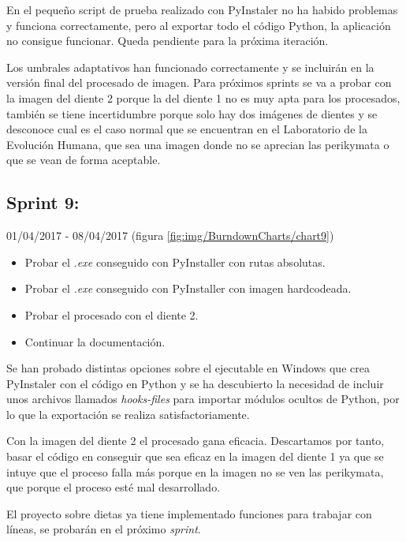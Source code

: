 En el pequeño script de prueba realizado con PyInstaler no ha habido problemas y funciona correctamente, pero al exportar todo el código Python, la aplicación no consigue funcionar. Queda pendiente para la próxima iteración.

Los umbrales adaptativos han funcionado correctamente y se incluirán en la versión final del procesado de imagen. Para próximos sprints se va a probar con la imagen del diente 2 porque la del diente 1 no es muy apta para los procesados, también se tiene incertidumbre porque solo hay dos imágenes de dientes y se desconoce cual es el caso normal que se encuentran en el Laboratorio de la Evolución Humana, que sea una imagen donde no se aprecian las perikymata o que se vean de forma aceptable.

\newpage

\subsection{Sprint 9:}
01/04/2017 - 08/04/2017 (figura \ref{fig:img/BurndownCharts/chart9})


\begin{itemize}
    \item Probar el \textit{.exe} conseguido con PyInstaller con rutas absolutas.
    \item Probar el \textit{.exe} conseguido con PyInstaller con imagen hardcodeada.
    \item Probar el procesado con el diente 2.
    \item Continuar la documentación.
\end{itemize}
Se han probado distintas opciones sobre el ejecutable en Windows que crea PyInstaler con el código en Python y se ha descubierto la necesidad de incluir unos archivos llamados \textit{hooks-files} para importar módulos ocultos de Python, por lo que la exportación se realiza satisfactoriamente.

Con la imagen del diente 2 el procesado gana eficacia. Descartamos por tanto, basar el código en conseguir que sea eficaz en la imagen del diente 1 ya que se intuye que el proceso falla más porque en la imagen no se ven las perikymata, que porque el proceso esté mal desarrollado.

El proyecto sobre dietas \cite{dietasIsma} ya tiene implementado funciones para trabajar con líneas, se probarán en el próximo \textit{sprint}.


